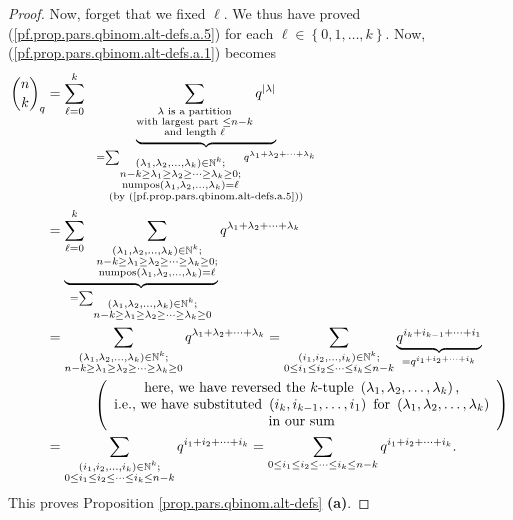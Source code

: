 \begin{proof}
Now, forget that we fixed $\ell$. We thus have proved
(\ref{pf.prop.pars.qbinom.alt-defs.a.5}) for each $\ell\in\left\{
0,1,\ldots,k\right\}  $. Now, (\ref{pf.prop.pars.qbinom.alt-defs.a.1}) becomes%
\begin{align*}
\dbinom{n}{k}_{q}  &  =\sum_{\ell=0}^{k}\ \ \underbrace{\sum
_{\substack{\lambda\text{ is a partition}\\\text{with largest part }\leq
n-k\\\text{and length }\ell}}q^{\left\vert \lambda\right\vert }}%
_{\substack{=\sum_{\substack{\left(  \lambda_{1},\lambda_{2},\ldots
,\lambda_{k}\right)  \in\mathbb{N}^{k};\\n-k\geq\lambda_{1}\geq\lambda_{2}%
\geq\cdots\geq\lambda_{k}\geq0;\\\operatorname*{numpos}\left(  \lambda
_{1},\lambda_{2},\ldots,\lambda_{k}\right)  =\ell}}q^{\lambda_{1}+\lambda
_{2}+\cdots+\lambda_{k}}\\\text{(by (\ref{pf.prop.pars.qbinom.alt-defs.a.5}%
))}}}\\
&  =\underbrace{\sum_{\ell=0}^{k}\ \ \sum_{\substack{\left(  \lambda
_{1},\lambda_{2},\ldots,\lambda_{k}\right)  \in\mathbb{N}^{k};\\n-k\geq
\lambda_{1}\geq\lambda_{2}\geq\cdots\geq\lambda_{k}\geq
0;\\\operatorname*{numpos}\left(  \lambda_{1},\lambda_{2},\ldots,\lambda
_{k}\right)  =\ell}}}_{=\sum_{\substack{\left(  \lambda_{1},\lambda_{2}%
,\ldots,\lambda_{k}\right)  \in\mathbb{N}^{k};\\n-k\geq\lambda_{1}\geq
\lambda_{2}\geq\cdots\geq\lambda_{k}\geq0}}}q^{\lambda_{1}+\lambda_{2}%
+\cdots+\lambda_{k}}\\
&  =\sum_{\substack{\left(  \lambda_{1},\lambda_{2},\ldots,\lambda_{k}\right)
\in\mathbb{N}^{k};\\n-k\geq\lambda_{1}\geq\lambda_{2}\geq\cdots\geq\lambda
_{k}\geq0}}q^{\lambda_{1}+\lambda_{2}+\cdots+\lambda_{k}}=\sum
_{\substack{\left(  i_{1},i_{2},\ldots,i_{k}\right)  \in\mathbb{N}^{k};\\0\leq
i_{1}\leq i_{2}\leq\cdots\leq i_{k}\leq n-k}}\underbrace{q^{i_{k}%
+i_{k-1}+\cdots+i_{1}}}_{=q^{i_{1}+i_{2}+\cdots+i_{k}}}\\
&  \ \ \ \ \ \ \ \ \ \ \left(
\begin{array}
[c]{c}%
\text{here, we have reversed the }k\text{-tuple }\left(  \lambda_{1}%
,\lambda_{2},\ldots,\lambda_{k}\right)  \text{,}\\
\text{i.e., we have substituted }\left(  i_{k},i_{k-1},\ldots,i_{1}\right)
\text{ for }\left(  \lambda_{1},\lambda_{2},\ldots,\lambda_{k}\right) \\
\text{in our sum}%
\end{array}
\right) \\
&  =\sum_{\substack{\left(  i_{1},i_{2},\ldots,i_{k}\right)  \in\mathbb{N}%
^{k};\\0\leq i_{1}\leq i_{2}\leq\cdots\leq i_{k}\leq n-k}}q^{i_{1}%
+i_{2}+\cdots+i_{k}}=\sum_{0\leq i_{1}\leq i_{2}\leq\cdots\leq i_{k}\leq
n-k}q^{i_{1}+i_{2}+\cdots+i_{k}}.
\end{align*}
This proves Proposition \ref{prop.pars.qbinom.alt-defs} \textbf{(a)}. \medskip


\end{proof}
